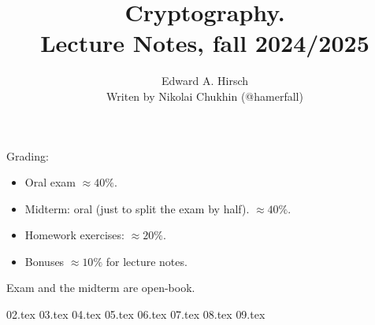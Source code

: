 \documentclass[a4paper,14pt]{extarticle}
\theoremstyle{definition}
\numberwithin{equation}{section} %
\numberwithin{figure}{section} %
\numberwithin{table}{section} %
\begin{document}
    \title{Cryptography. \\ Lecture Notes, fall 2024/2025}
    \author{Edward A. Hirsch \\ Writen by Nikolai Chukhin (@hamerfall)}
    \date{}
    \maketitle
    \newpage

    \tableofcontents
    \newpage

    Grading:
    \begin{itemize}
        \item Oral exam $\approx 40\%$.
        \item Midterm: oral (just to split the exam by half). $\approx 40\%$.
        \item Homework exercises: $\approx 20\%$.
        \item Bonuses $\approx 10\%$ for lecture notes.
    \end{itemize}
    Exam and the midterm are open-book.

    {02.tex}
    {03.tex}
    {04.tex}
    {05.tex}
    {06.tex}
    {07.tex}
    {08.tex}
    {09.tex}

    \clearpage
    \listoftodos
\end{document}
